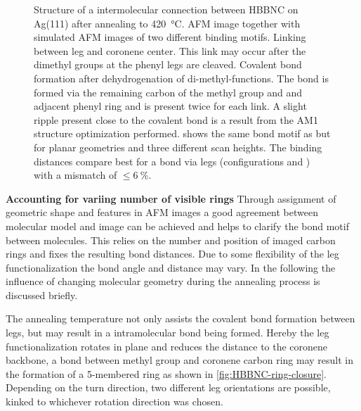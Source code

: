 \begin{figure}[]
	\caption{Structure of a intermolecular connection between HBBNC on Ag(111) after annealing to \SI{420}{\celsius}. AFM image  together with simulated AFM images of two different binding motifs.  Linking between leg and coronene center. This link may occur after the dimethyl groups at the phenyl legs are cleaved.  Covalent bond formation after dehydrogenation of di-methyl-functions. The bond is formed via the remaining carbon of the methyl group and and adjacent phenyl ring and is present twice for each link. A slight ripple present close to the covalent bond is a result from the AM1 structure optimization performed.  shows the same bond motif as  but for planar geometries and three different scan heights. The binding distances compare best for a bond via legs (configurations  and ) with a mismatch of $\leq \SI{6}{\percent}$.}
	\label{fig:HBBNC-linking}
\end{figure}


\textbf{Accounting for variing number of visible rings}
Through assignment of geometric shape and features in AFM images a good agreement between molecular model and image can be achieved and helps to clarify the bond motif between molecules. This relies on the number and position of imaged carbon rings and fixes the resulting bond distances. 
 Due to some flexibility of the leg functionalization the bond angle and distance may vary. In the following the influence of changing molecular geometry during the annealing process is discussed briefly.
 
The annealing temperature not only assists the covalent bond formation between legs, but may result in a intramolecular bond being formed. Hereby the leg functionalization rotates in plane and reduces the distance to the coronene backbone, a bond between methyl group and coronene carbon ring may result in the formation of a 5-membered ring as shown in \autoref{fig:HBBNC-ring-closure}. Depending on the turn direction, two different leg orientations are possible, kinked to whichever rotation direction was chosen.

